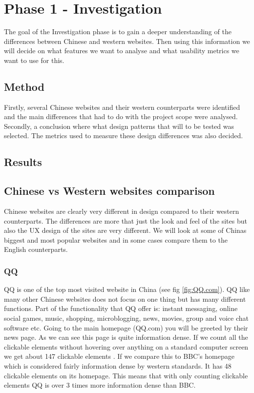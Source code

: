 
\chapter{Phase 1 - Investigation} %

\label{Chapter4} %

The goal of the Investigation phase is to gain a deeper understanding of the differences between Chinese and western websites. Then using this information we will decide on what features we want to analyse and what usability metrics we want to use for this.
\section{Method}
Firstly, several Chinese websites and their western counterparts were identified and the main differences that had to do with the project scope were analysed. Secondly, a conclusion where what design patterns that will to be tested was selected. The metrics used to measure these design differences was also decided.

\section{Results}
\section{Chinese vs Western websites comparison}
Chinese websites are clearly very different in design compared to their western counterparts. The differences are more that just the look and feel of the sites but also the UX design of the sites are very different. We will look at some of Chinas biggest and most popular websites and in some cases compare them to the English counterparts. 

\subsection{QQ}
QQ is one of the top most visited website in China (see fig \ref{fig:QQ.com}). \cite{top_sites_china} \cite{top_sites_alexa} QQ like many other Chinese websites does not focus on one thing but has many different functions. Part of the functionality that QQ offer is: instant messaging, online social games, music, shopping, microblogging, news, movies, group and voice chat software etc. Going to the main homepage (QQ.com) you will be greeted by their news page. As we can see this page is quite information dense. If we count all the clickable elements without hovering over anything on a standard computer screen we get about 147 clickable elements . If we compare this to BBC's homepage \cite{bbc} which is considered fairly information dense by western standards.  It has 48 clickable elements on its homepage. This means that with only counting clickable elements QQ is over 3 times more information dense than BBC. 


